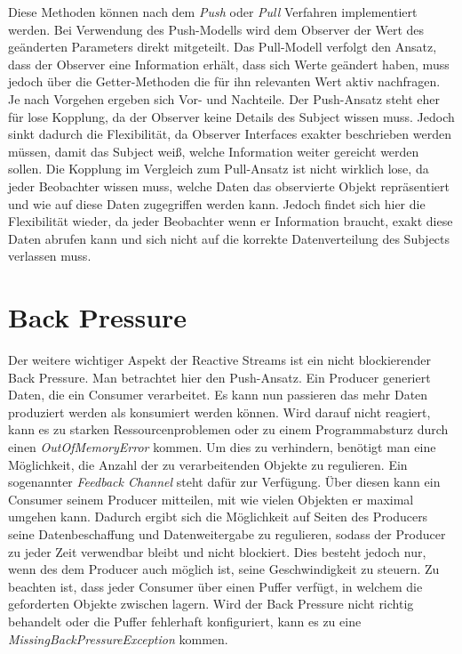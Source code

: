 Diese Methoden können nach dem \textit{Push} oder \textit{Pull} Verfahren implementiert werden. Bei Verwendung des Push-Modells wird dem Observer der Wert des geänderten Parameters direkt mitgeteilt. Das Pull-Modell verfolgt den Ansatz, dass der Observer eine Information erhält, dass sich Werte geändert haben, muss jedoch über die Getter-Methoden die für ihn relevanten Wert aktiv nachfragen. Je nach Vorgehen ergeben sich Vor- und Nachteile. Der Push-Ansatz steht eher für lose Kopplung, da der Observer keine Details des Subject wissen muss. Jedoch sinkt dadurch die Flexibilität, da Observer Interfaces exakter beschrieben werden müssen, damit das Subject weiß, welche Information weiter gereicht werden sollen. Die Kopplung im Vergleich zum Pull-Ansatz ist nicht wirklich lose, da jeder Beobachter wissen muss, welche Daten das observierte Objekt repräsentiert und wie auf diese Daten zugegriffen werden kann. Jedoch findet sich hier die Flexibilität wieder, da jeder Beobachter wenn er Information braucht, exakt diese Daten abrufen kann und sich nicht auf die korrekte Datenverteilung des Subjects verlassen muss.
\section{Back Pressure}
Der weitere wichtiger Aspekt der Reactive Streams ist ein nicht blockierender Back Pressure. Man betrachtet hier den Push-Ansatz. Ein Producer generiert Daten, die ein Consumer verarbeitet. Es kann nun passieren das mehr Daten produziert werden als konsumiert werden können. Wird darauf nicht reagiert, kann es zu starken Ressourcenproblemen oder zu einem Programmabsturz durch einen \textit{OutOfMemoryError} kommen. Um dies zu verhindern, benötigt man eine Möglichkeit, die Anzahl der zu verarbeitenden Objekte zu regulieren. Ein sogenannter \textit{Feedback Channel} steht dafür zur Verfügung. Über diesen kann ein Consumer seinem Producer mitteilen, mit wie vielen Objekten er maximal umgehen kann. Dadurch ergibt sich die Möglichkeit auf Seiten des Producers seine Datenbeschaffung und Datenweitergabe zu regulieren, sodass der Producer zu jeder Zeit verwendbar bleibt und nicht blockiert. Dies besteht jedoch nur, wenn des dem Producer auch möglich ist, seine Geschwindigkeit zu steuern. Zu beachten ist, dass jeder Consumer über einen Puffer verfügt, in welchem die geforderten Objekte zwischen lagern. Wird der Back Pressure nicht richtig behandelt oder die Puffer fehlerhaft konfiguriert, kann es zu eine \textit{MissingBackPressureException} kommen.
